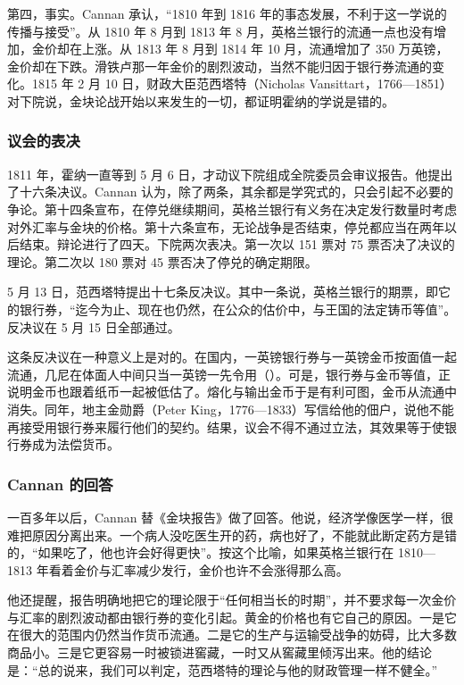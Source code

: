 第四，事实。Cannan 承认，“1810 年到 1816 年的事态发展，不利于这一学说的传播与接受”。从 1810 年 8 月到 1813 年 8 月，英格兰银行的流通一点也没有增加，金价却在上涨。从 1813 年 8 月到 1814 年 10 月，流通增加了 350 万英镑，金价却在下跌。滑铁卢那一年金价的剧烈波动，当然不能归因于银行券流通的变化\cite{cannan1919}。1815 年 2 月 10 日，财政大臣范西塔特（Nicholas Vansittart，1766—1851）对下院说，金块论战开始以来发生的一切，都证明霍纳的学说是错的\cite{cannan1919}。

\subsubsection{议会的表决}
1811 年，霍纳一直等到 5 月 6 日，才动议下院组成全院委员会审议报告\cite{cannan1919}。他提出了十六条决议。Cannan 认为，除了两条，其余都是学究式的，只会引起不必要的争论。第十四条宣布，在停兑继续期间，英格兰银行有义务在决定发行数量时考虑对外汇率与金块的价格。第十六条宣布，无论战争是否结束，停兑都应当在两年以后结束\cite{cannan1919}。辩论进行了四天。下院两次表决。第一次以 151 票对 75 票否决了决议的理论。第二次以 180 票对 45 票否决了停兑的确定期限\cite{cannan1919}。

5 月 13 日，范西塔特提出十七条反决议\cite{cannan1919}。其中一条说，英格兰银行的期票，即它的银行券，“迄今为止、现在也仍然，在公众的估价中，与王国的法定铸币等值”\cite{cannan1919}。反决议在 5 月 15 日全部通过\cite{cannan1919}。

这条反决议在一种意义上是对的。在国内，一英镑银行券与一英镑金币按面值一起流通，几尼在体面人中间只当一英镑一先令用（）。可是，银行券与金币等值，正说明金币也跟着纸币一起被低估了。熔化与输出金币于是有利可图，金币从流通中消失。同年，地主金勋爵（Peter King，1776—1833）写信给他的佃户，说他不能再接受用银行券来履行他们的契约\cite{cannan1919}。结果，议会不得不通过立法，其效果等于使银行券成为法偿货币\cite{cannan1919}。

\subsubsection{Cannan 的回答}
一百多年以后，Cannan 替《金块报告》做了回答。他说，经济学像医学一样，很难把原因分离出来。一个病人没吃医生开的药，病也好了，不能就此断定药方是错的，“如果吃了，他也许会好得更快”\cite{cannan1919}。按这个比喻，如果英格兰银行在 1810—1813 年看着金价与汇率减少发行，金价也许不会涨得那么高。

他还提醒，报告明确地把它的理论限于“任何相当长的时期”\cite{cannan1919,bullion1810}，并不要求每一次金价与汇率的剧烈波动都由银行券的变化引起。黄金的价格也有它自己的原因。一是它在很大的范围内仍然当作货币流通。二是它的生产与运输受战争的妨碍，比大多数商品小。三是它更容易一时被锁进窖藏，一时又从窖藏里倾泻出来\cite{cannan1919}。他的结论是：“总的说来，我们可以判定，范西塔特的理论与他的财政管理一样不健全。”\cite{cannan1919}

